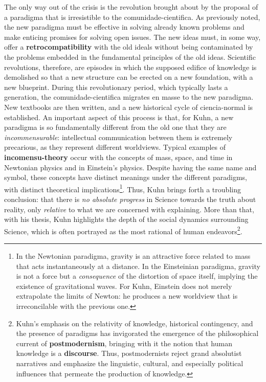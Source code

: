 \documentclass[./main_en.tex]{subfiles}
\begin{document}
\par The only way out of the crisis is the revolution brought about by the proposal of a \gls{paradigma} that is irresistible to the \gls{comunidade-cientifica}. As previously noted, the new \gls{paradigma} must be effective in solving already known problems and make enticing promises for solving open issues. The new ideas must, in some way, offer a \textbf{retrocompatibility} with the old ideals without being contaminated by the problems embedded in the fundamental principles of the old ideas. Scientific revolutions, therefore, are episodes in which the supposed edifice of knowledge is demolished so that a new structure can be erected on a new foundation, with a new blueprint. During this revolutionary period, which typically lasts a generation, the \gls{comunidade-cientifica} migrates en masse to the new \gls{paradigma}. New textbooks are then written, and a new historical cycle of \gls{ciencia-normal} is established. An important aspect of this process is that, for Kuhn, a new \gls{paradigma} is so fundamentally different from the old one that they are \textit{incommensurable}: intellectual communication between them is extremely precarious, as they represent different worldviews. Typical examples of \textbf{\gls{incomensu-theory}} occur with the concepts of mass, space, and time in Newtonian physics and in Einstein's physics. Despite having the same name and symbol, these concepts have distinct meanings under the different paradigms, with distinct theoretical implications\footnote{In the Newtonian \gls{paradigma}, gravity is an attractive force related to mass that acts instantaneously at a distance. In the Einsteinian \gls{paradigma}, gravity is not a force but a \textit{consequence} of the distortion of space itself, implying the existence of gravitational waves. For Kuhn, Einstein does not merely extrapolate the limits of Newton: he produces a new worldview that is irreconcilable with the previous one.}. Thus, Kuhn brings forth a troubling conclusion: that there is \textit{no absolute progress} in Science towards the truth about reality, only \textit{relative} to what we are concerned with explaining. More than that, with his thesis, Kuhn highlights the depth of the social dynamics surrounding Science, which is often portrayed as the most rational of human endeavors\footnote{Kuhn's emphasis on the relativity of knowledge, historical contingency, and the presence of paradigms has invigorated the emergence of the philosophical current of \textbf{postmodernism}, bringing with it the notion that human knowledge is a \textbf{discourse}. Thus, postmodernists reject grand absolutist narratives and emphasize the linguistic, cultural, and especially political influences that permeate the production of knowledge.}.
\end{document}
